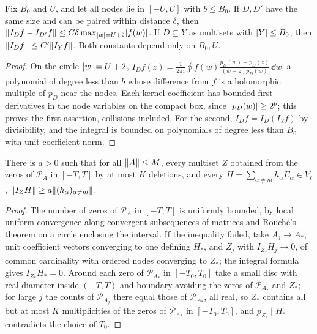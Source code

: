 \begin{lemma}\label{zer:lem:stableinterp}
Fix $B_0$ and $U$, and let all nodes lie in $[-U,U]$ with $b\le B_0$. If $D,D'$ have the same size and can be
paired within distance $\delta$, then $\lVert I_Df-I_{D'}f\rVert\le C\delta\max_{\lvert w\rvert=U+2}\lvert f(w)\rvert$. If
$D\subseteq Y$ as multisets with $\lvert Y\rvert\le B_0$, then $\lVert I_Df\rVert\le C'\lVert I_Yf\rVert$. Both constants depend only
on $B_0,U$.
\end{lemma}
\begin{proof}
On the circle $\lvert w\rvert=U+2$,
$I_Df(z)=\frac1{2\pi i}\oint f(w)\frac{p_D(w)-p_D(z)}{(w-z)p_D(w)}\,\dd w$, a polynomial of degree less than $b$
whose difference from $f$ is a holomorphic multiple of $p_D$ near the nodes. Each kernel coefficient has
bounded first derivatives in the node variables on the compact box, since $\lvert p_D(w)\rvert\ge2^b$; this
proves the first assertion, collisions included. For the second, $I_Df=I_D(I_Yf)$ by divisibility, and the
integral is bounded on polynomials of degree less than $B_0$ with unit coefficient norm.
\end{proof}

\begin{lemma}\label{zer:lem:stablefloor}
There is $a>0$ such that for all $\lVert A\rVert\le M$, every multiset $Z$ obtained from the zeros of $\mathcal P_A$
in $[-T,T]$ by at most $K$ deletions, and every $H=\sum_{\alpha\ne m}h_\alpha E_\alpha\in V_\ell$,
$\lVert I_ZH\rVert\ge a\lVert(h_\alpha)_{\alpha\ne m}\rVert$.
\end{lemma}
\begin{proof}
The number of zeros of $\mathcal P_A$ in $[-T,T]$ is uniformly bounded, by local uniform convergence along
convergent subsequences of matrices and Rouch\'e's theorem on a circle enclosing the interval. If the
inequality failed, take $A_j\to A_*$, unit coefficient vectors converging to one defining $H_*$, and $Z_j$
with $I_{Z_j}H_j\to0$, of common cardinality with ordered nodes converging to $Z_*$; the integral formula
gives $I_{Z_*}H_*=0$. Around each zero of $\mathcal P_{A_*}$ in $[-T_0,T_0]$ take a small disc with real
diameter inside $(-T,T)$ and boundary avoiding the zeros of $\mathcal P_{A_*}$ and $Z_*$; for large $j$ the
counts of $\mathcal P_{A_j}$ there equal those of $\mathcal P_{A_*}$, all real, so $Z_*$ contains all but at
most $K$ multiplicities of the zeros of $\mathcal P_{A_*}$ in $[-T_0,T_0]$, and $p_{Z_*}\mid H_*$ contradicts
the choice of $T_0$.
\end{proof}

